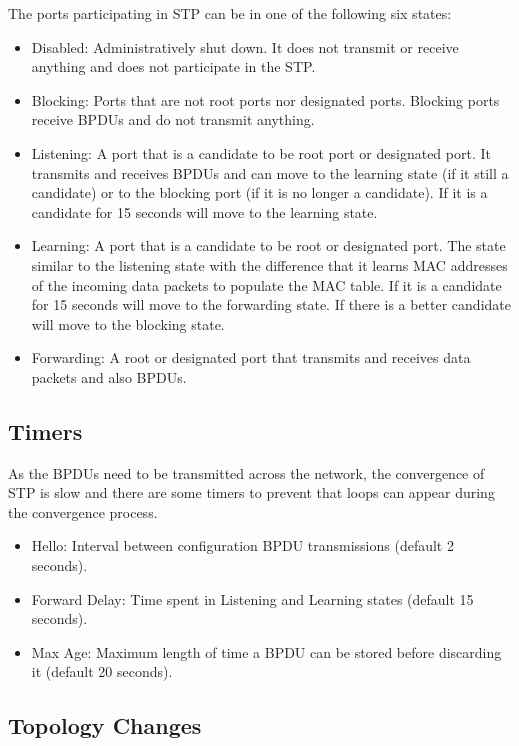 The ports participating in STP can be in one of the following six states:
\begin{itemize}
\item Disabled: Administratively shut down. It does not transmit or receive anything and does not participate in the STP.
\item Blocking: Ports that are not root ports nor designated ports.
Blocking ports receive BPDUs and do not transmit anything.
\item Listening: A port that is a candidate to be root port or designated port. 
It transmits and receives BPDUs and can move to the learning state (if it still a candidate) or to the blocking port (if it is no longer a candidate).
If it is a candidate for 15 seconds will move to the learning state.
\item Learning: A port that is a candidate to be root or designated port.
The state similar to the listening state with the difference that it learns MAC addresses of the incoming data packets to populate the MAC table.
If it is a candidate for 15 seconds will move to the forwarding state.
If there is a better candidate will move to the blocking state.
\item Forwarding: A root or designated port that transmits and receives data packets and also BPDUs.
\end{itemize}

\subsection{Timers}

As the BPDUs need to be transmitted across the network, the convergence of STP is slow and there are some timers to prevent that loops can appear during the convergence process.

\begin{itemize}
\item Hello: Interval between configuration BPDU transmissions (default 2 seconds).
\item Forward Delay: Time spent in Listening and Learning states (default 15 seconds).
\item Max Age: Maximum length of time a BPDU can be stored before discarding it (default 20 seconds).
\end{itemize}

\subsection{Topology Changes}


